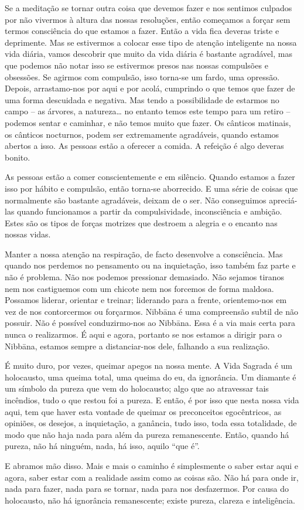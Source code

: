 Se a meditação se tornar outra coisa que devemos fazer e nos sentimos culpados
por não vivermos à altura das nossas resoluções, então começamos a forçar sem
termos consciência do que estamos a fazer. Então a vida fica deveras triste e
deprimente. Mas se estivermos a colocar esse tipo de atenção inteligente na
nossa vida diária, vamos descobrir que muito da vida diária é bastante
agradável, mas que podemos não notar isso se estivermos presos nas nossas
compulsões e obsessões. Se agirmos com compulsão, isso torna-se um fardo, uma
opressão. Depois, arrastamo-nos por aqui e por acolá, cumprindo o que temos que
fazer de uma forma descuidada e negativa. Mas tendo a possibilidade de estarmos
no campo -- as árvores, a natureza\ldots{} no entanto temos este tempo para um
retiro -- podemos sentar e caminhar, e não temos muito que fazer. Os cânticos
matinais, os cânticos nocturnos, podem ser extremamente agradáveis, quando
estamos abertos a isso. As pessoas estão a oferecer a comida. A refeição é algo
deveras bonito.

As pessoas estão a comer conscientemente e em silêncio. Quando estamos a fazer
isso por hábito e compulsão, então torna-se aborrecido. E uma série de coisas
que normalmente são bastante agradáveis, deixam de o ser. Não conseguimos
apreciá-las quando funcionamos a partir da compulsividade, inconsciência e
ambição. Estes são os tipos de forças motrizes que destroem a alegria e o
encanto nas nossas vidas.

Manter a nossa atenção na respiração, de facto desenvolve a consciência. Mas
quando nos perdemos no pensamento ou na inquietação, isso também faz parte e não
é problema. Não nos podemos pressionar demasiado. Não sejamos tiranos nem nos
castiguemos com um chicote nem nos forcemos de forma maldosa. Possamos liderar,
orientar e treinar; liderando para a frente, orientemo-nos em vez de nos
contorcermos ou forçarmos. Nibbāna é uma compreensão subtil de não possuir. Não
é possível conduzirmo-nos ao Nibbāna. Essa é a via mais certa para nunca o
realizarmos. É aqui e agora, portanto se nos estamos a dirigir para o Nibbāna,
estamos sempre a distanciar-nos dele, falhando a sua realização.

É muito duro, por vezes, queimar apegos na nossa mente. A Vida Sagrada é um
holocausto, uma queima total, uma queima do eu, da ignorância. Um diamante é um
símbolo da pureza que vem do holocausto; algo que ao atravessar tais incêndios,
tudo o que restou foi a pureza. E então, é por isso que nesta nossa vida aqui,
tem que haver esta vontade de queimar os preconceitos egocêntricos, as opiniões,
os desejos, a inquietação, a ganância, tudo isso, toda essa totalidade, de modo
que não haja nada para além da pureza remanescente. Então, quando há pureza, não
há ninguém, nada, há isso, aquilo ``que é''.

E abramos mão disso. Mais e mais o caminho é simplesmente o saber estar aqui e
agora, saber estar com a realidade assim como as coisas são. Não há para onde
ir, nada para fazer, nada para se tornar, nada para nos desfazermos. Por causa
do holocausto, não há ignorância remanescente; existe pureza, clareza e
inteligência.
